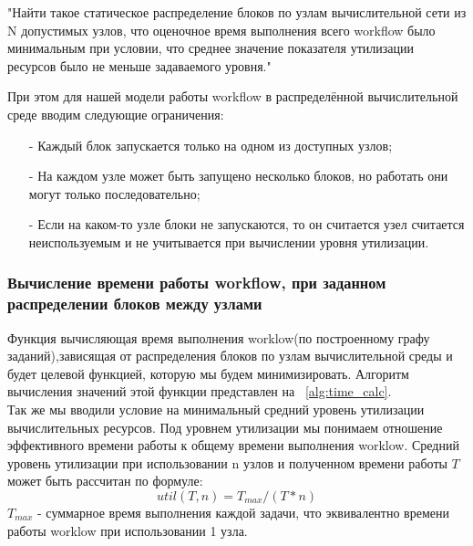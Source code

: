 \documentclass[a4paper,12pt]{article}
\begin{document}
\par "Найти такое статическое распределение блоков по узлам вычислительной сети из N допустимых узлов, что оценочное время выполнения всего workflow было минимальным при условии, что среднее значение показателя утилизации ресурсов было не меньше задаваемого уровня."

При этом для нашей модели работы workflow в распределённой вычислительной среде вводим следующие ограничения:
\begin{enumerate}
\item[-] Каждый блок запускается только на одном из доступных узлов;
\item[-] На каждом узле может быть запущено несколько блоков, но работать они могут только последовательно;
\item[-] Если на каком-то узле блоки не запускаются, то он считается узел считается неиспользуемым и не учитывается при вычислении уровня утилизации.
\end{enumerate}

\subsubsection{Вычисление времени работы workflow, при заданном распределении блоков между узлами}
Функция вычисляющая время выполнения worklow(по построенному графу заданий),зависящая от распределения блоков по узлам вычислительной среды и будет целевой функцией, которую мы будем минимизировать. Алгоритм вычисления значений этой функции представлен на ~\cref{alg:time_calc}.\\
Так же мы вводили условие на минимальный средний уровень утилизации вычислительных ресурсов. Под уровнем утилизации мы понимаем отношение эффективного времени работы к общему времени выполнения worklow. 
Средний уровень утилизации при использовании n узлов и полученном времени работы $T$ может быть рассчитан по формуле:
\begin{equation}
util(T, n) = T_{max}/(T * n)
\end{equation}
$T_{max}$ - суммарное время выполнения каждой задачи, что эквивалентно времени работы worklow при использовании 1 узла. 
\end{document}
